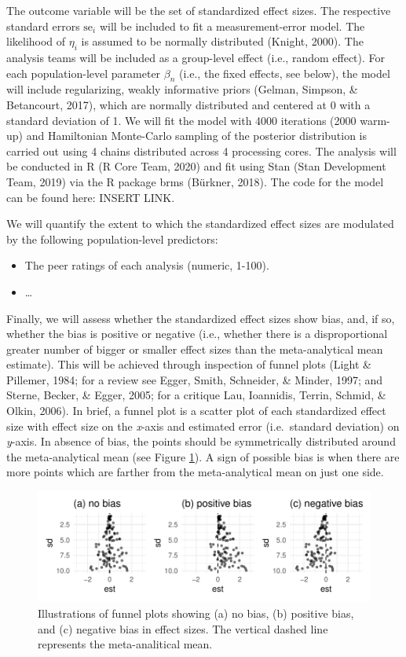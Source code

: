 \documentclass[
  english,
  man,floatsintext]{apa6}
\providecommand{\tightlist}{%
  \setlength{\itemsep}{0pt}\setlength{\parskip}{0pt}}
\begin{document}
The outcome variable will be the set of standardized effect sizes.
The respective standard errors \(\text{se}_i\) will be included to fit a measurement-error model.
The likelihood of \(\eta_i\) is assumed to be normally distributed (Knight, 2000).
The analysis teams will be included as a group-level effect (i.e., random effect).
For each population-level parameter \(\beta_n\) (i.e., the fixed effects, see below), the model will include regularizing, weakly informative priors (Gelman, Simpson, \& Betancourt, 2017), which are normally distributed and centered at 0 with a standard deviation of 1.
We will fit the model with 4000 iterations (2000 warm-up) and Hamiltonian Monte-Carlo sampling of the posterior distribution is carried out using 4 chains distributed across 4 processing cores.
The analysis will be conducted in R (R Core Team, 2020) and fit using Stan (Stan Development Team, 2019) via the R package brms (Bürkner, 2018).
The code for the model can be found here: INSERT LINK.

We will quantify the extent to which the standardized effect sizes are modulated by the following population-level predictors:

\begin{itemize}
\tightlist
\item
  The peer ratings of each analysis (numeric, 1-100).
\item
  \ldots{}
\end{itemize}

Finally, we will assess whether the standardized effect sizes show bias, and, if so, whether the bias is positive or negative (i.e., whether there is a disproportional greater number of bigger or smaller effect sizes than the meta-analytical mean estimate).
This will be achieved through inspection of funnel plots (Light \& Pillemer, 1984; for a review see Egger, Smith, Schneider, \& Minder, 1997; and Sterne, Becker, \& Egger, 2005; for a critique Lau, Ioannidis, Terrin, Schmid, \& Olkin, 2006).
In brief, a funnel plot is a scatter plot of each standardized effect size with effect size on the \emph{x}-axis and estimated error (i.e.~standard deviation) on \emph{y}-axis.
In absence of bias, the points should be symmetrically distributed around the meta-analytical mean (see Figure \ref{fig:funnel-plot}).
A sign of possible bias is when there are more points which are farther from the meta-analytical mean on just one side.

\begin{figure}
\centering
\includegraphics{Draft_RR_files/figure-latex/funnel-plot-1.pdf}
\caption{\label{fig:funnel-plot}Illustrations of funnel plots showing (a) no bias, (b) positive bias, and (c) negative bias in effect sizes. The vertical dashed line represents the meta-analitical mean.}
\end{figure}
\end{document}
